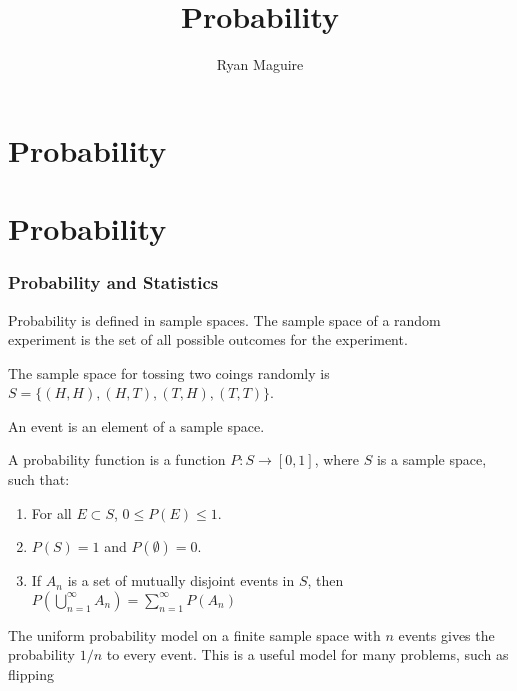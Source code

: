 \documentclass[crop=false,class=book,oneside]{standalone}                      %
\begin{document}
    \ifx\ifmain\undefined
        \title{Probability}
        \author{Ryan Maguire}
        \date{\vspace{-5ex}}
        \maketitle
        \tableofcontents
        \chapter*{Probability}
        \setcounter{chapter}{1}
    \else
        \chapter{Probability}
    \fi
    \subsection{Probability and Statistics}
        Probability is defined in sample spaces. The sample space of
        a random experiment is the set of all
        possible outcomes for the experiment.
        \begin{example}
            The sample space for tossing two coings randomly is
            $S=\{(H,H),(H,T),(T,H),(T,T)\}$.
        \end{example}
        \begin{definition}
            An event is an element of a sample space.
        \end{definition}
        \begin{definition}
            A probability function is a function
            $P:S\rightarrow[0,1]$, where $S$ is a sample
            space, such that:
            \begin{enumerate}
                \item For all $E\subset{S}$, $0\leq{P(E)}\leq{1}$.
                \item $P(S)=1$ and $P(\emptyset)=0$.
                \item If $A_{n}$ is a set of mutually disjoint
                      events in $S$, then
                      $P(\bigcup_{n=1}^{\infty}A_{n})%
                       =\sum_{n=1}^{\infty}P(A_{n})$
            \end{enumerate}
        \end{definition}
        The uniform probability model on a finite sample space with
        $n$ events gives the probability $1/n$ to every event.
        This is a useful model for many problems, such as flipping
\end{document}
